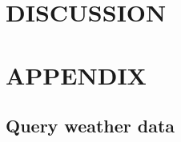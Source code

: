 \documentclass[12pt]{book}
\numberwithin{equation}{chapter}
\begin{document}
\hypertarget{discussion}{%
\chapter{DISCUSSION}\label{discussion}}

\singlespacing

\hypertarget{appendix}{%
\chapter*{APPENDIX}\label{appendix}}

\hypertarget{weatherdat}{%
\section*{Query weather data}\label{weatherdat}}
\end{document}

